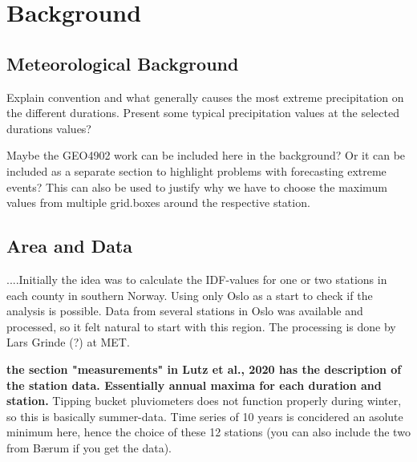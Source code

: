 \documentclass[12pt]{article}
\begin{document}
\section{Background}
\subsection{Meteorological Background}

Explain convention and what generally causes the most extreme precipitation on the different durations. Present some typical precipitation values at the selected durations values?

Maybe the GEO4902 work can be included here in the background? Or it can be included as a separate section to highlight problems with forecasting extreme events? This can also be used to justify why we have to choose the maximum values from multiple grid.boxes around the respective station.   

\subsection{Area and Data}

....Initially the idea was to calculate the IDF-values for one or two stations in each county in southern Norway. Using only Oslo as a start to check if the analysis is possible. Data from several stations in Oslo was available and processed, so it felt natural to start with this region. The processing is done by Lars Grinde (?) at MET.  

\textbf{the section "measurements" in Lutz et al., 2020 has the description of the station data. Essentially annual maxima for each duration and station.} Tipping bucket pluviometers does not function properly during winter, so this is basically summer-data. Time series of 10 years is concidered an asolute minimum here, hence the choice of these 12 stations (you can also include the two from Bærum if you get the data). 
\end{document}
